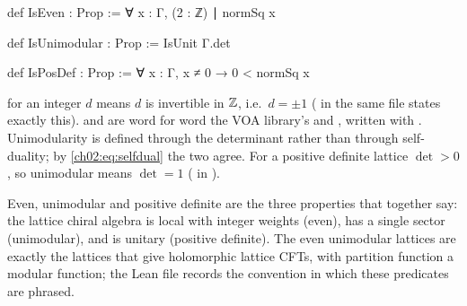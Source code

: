 \begin{definition}\label{ch02:def:ebeprops}
\end{definition}
\begin{leancode}
def IsEven : Prop := ∀ x : Γ, (2 : ℤ) ∣ normSq x

def IsUnimodular : Prop := IsUnit Γ.det

def IsPosDef : Prop := ∀ x : Γ, x ≠ 0 → 0 < normSq x
\end{leancode}
\begin{dictionary}
 for an integer $d$ means $d$ is invertible in ${\mathbb{Z}}$, i.e.\ $d=\pm1$
( in the same file states exactly this).   and
 are word for word the VOA library's  and , written with
.  Unimodularity is defined through the determinant rather than through
self-duality; by \eqref{ch02:eq:selfdual} the two agree.  For a positive definite lattice
$\det>0$, so unimodular means $\det=1$ ( in
).
\end{dictionary}
\begin{physics}
Even, unimodular and positive definite are the three properties that together say: the lattice chiral algebra is local with integer weights (even), has a single sector (unimodular), and is unitary (positive definite). The even unimodular lattices are exactly the lattices that give holomorphic lattice CFTs, with partition function a modular function; the Lean file records the convention in which these predicates are phrased.
\end{physics}

